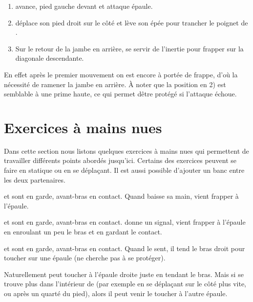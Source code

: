 \begin{technique}
\label{att:tech:changement-garde-2-temps-latéral-prime}

\begin{enumerate}
	\item \D avance, pied gauche devant et \A attaque épaule.
	
	\item \D déplace son pied droit sur le côté et lève son épée pour trancher le poignet de \A.
	
	\item Sur le retour de la jambe en arrière, se servir de l'inertie pour frapper sur la diagonale descendante.
\end{enumerate}

En effet après le premier mouvement on est encore à portée de frappe, d'où la nécessité de ramener la jambe en arrière.
À noter que la position en 2) est semblable à une prime haute, ce qui permet dêtre protégé si l'attaque échoue.
\end{technique}


\section{Exercices à mains nues}


Dans cette section nous listons quelques exercices à mains nues qui permettent de travailler différents points abordés jusqu'ici.
Certains des exercices peuvent se faire en statique ou en se déplaçant.
Il est aussi possible d'ajouter un banc entre les deux partenaires.


\begin{exercice}
\label{struct:ex:contact:frappe-signal}

\A et \D sont en garde, avant-bras en contact.
Quand \A baisse sa main, \D vient frapper à l'épaule.

\end{exercice}


\begin{exercice}

\A et \D sont en garde, avant-bras en contact.
\A donne un signal, \D vient frapper à l'épaule en enroulant un peu le bras et en gardant le contact.

\end{exercice}


\begin{exercice}
\label{struct:ex:contact:frappe-épaules}

\A et \D sont en garde, avant-bras en contact.
Quand \A le sent, il tend le bras droit pour toucher \D sur une épaule (\D ne cherche pas à se protéger).

Naturellement \A peut toucher \D à l'épaule droite juste en tendant le bras.
Mais si \A se trouve plus dans l'intérieur de \D (par exemple en se déplaçant sur le côté plus vite, ou après un quarté du pied), alors il peut venir le toucher à l'autre épaule.
\end{exercice}


